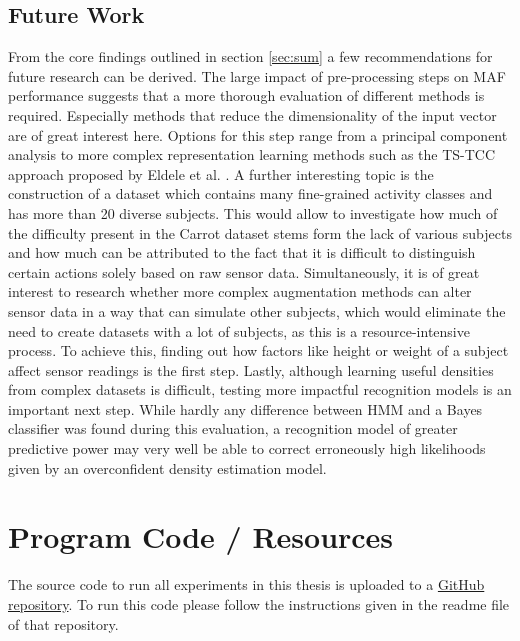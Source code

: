 \documentclass[11pt,titlepage,oneside,openany]{book}
\begin{document}
\section{Future Work}
\label{sec:future}
From the core findings outlined in section \ref{sec:sum} a few recommendations for future research can be derived. The large impact of pre-processing steps on MAF performance suggests that a more thorough evaluation of different methods is required. Especially methods that reduce the dimensionality of the input vector are of great interest here. Options for this step range from a principal component analysis to more complex representation learning methods such as the TS-TCC approach proposed by Eldele et al. \cite{eldele_time-series_2021}. A further interesting topic is the construction of a dataset which contains many fine-grained activity classes and has more than 20 diverse subjects. This would allow to investigate how much of the difficulty present in the Carrot dataset stems form the lack of various subjects and how much can be attributed to the fact that it is difficult to distinguish certain actions solely based on raw sensor data. Simultaneously, it  is of great interest to research whether more complex augmentation methods can alter sensor data in a way that can simulate other subjects, which would eliminate the need to create datasets with a lot of subjects, as this is a resource-intensive process. To achieve this, finding out how factors like height or weight of a subject affect sensor readings is the first step. Lastly, although learning useful densities from complex datasets is difficult, testing more impactful recognition models is an important next step. While hardly any difference between HMM and a Bayes classifier was found during this evaluation, a recognition model of greater predictive power may very well be able to correct erroneously high likelihoods given by an overconfident density estimation model.





\appendix

\chapter{Program Code / Resources}
\label{cha:appendix-a}

The source code to run all experiments in this thesis is uploaded to a \href{https://github.com/blasotta/CCBM_HAR}{GitHub repository}. To run this code please follow the instructions given in the readme file of that repository.
\end{document}
